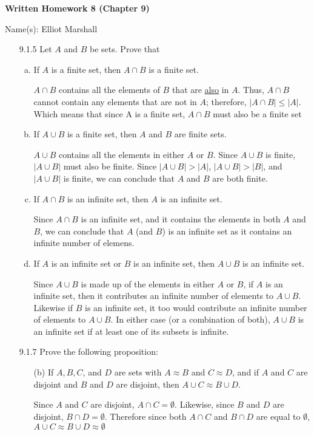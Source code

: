 \documentclass[11pt]{article}
\begin{document}
\centerline{\bf Written Homework 8 (Chapter 9)}


\centerline{Name(s): Elliot Marshall}

\begin{itemize}
\item[9.1.5] Let $A$ and $B$ be sets. Prove that

\begin{enumerate}[(a)]
\item If $A$ is a finite set, then $A\cap B$ is a finite set.
\par $A\cap B$ contains all the elements of $B$ that are \underline{also} in $A$.
Thus, $A\cap B$ cannot contain any elements that are not in $A$; therefore, 
$|A\cap B|\leq |A|$. Which means that since A is a finite set, $A\cap B$ must 
also be a finite set
\item If $A\cup B$ is a finite set, then $A$ and $B$ are finite sets.
\par $A\cup B$ contains all the elements in either $A$ or $B$. Since $A\cup B $
is finite, $|A\cup B|$ must also be finite. Since $|A\cup B| > |A|$, 
$|A\cup B| > |B|$, and $|A\cup B|$ is finite, we can conclude that $A$ and $B$ are both finite.
\item If $A\cap B$ is an infinite set, then $A$ is an infinite set.
\par Since $A\cap B$ is an infinite set, and it contains the elements in both $A$ and $B$, 
we can conclude that $A$ (and $B$) is an infinite set as it contains an infinite number of elemens.
\item If $A$ is an infinite set or $B$ is an infinite set, then $A\cup B$ is an infinite set.
\par Since $A\cup B$ is made up of the elements in either $A$ or $B$, if $A$ is an infinite set, 
then it contributes an infinite number of elements to $A\cup B$. Likewise if $B$ is an infinite set, 
it too would contribute an infinite number of elements to $A\cup B$. In either case (or a combination
 of both), $A\cup B$ is an infinite set if at least one of its subsets is infinite.
\end{enumerate}

\hrulefill

\item[9.1.7] Prove the following proposition:
\begin{enumerate}
\item[(b)] If $A,B,C$, and $D$ are sets with $A\approx B$ and $C\approx D$, and if $A$ and $C$ are 
disjoint and $B$ and $D$ are disjoint, then $A\cup C\approx B\cup D$.
\par Since $A$ and $C$ are disjoint, $A\cap C = \emptyset$. Likewise, since $B$ and $D$ are disjoint,
$B\cap D = \emptyset$. Therefore since both $A\cap C$ and $B\cap D$ are equal to $\emptyset$, 
$A\cup C\approx B\cup D\approx \emptyset$
\end{enumerate}


\end{itemize}
\end{document}
